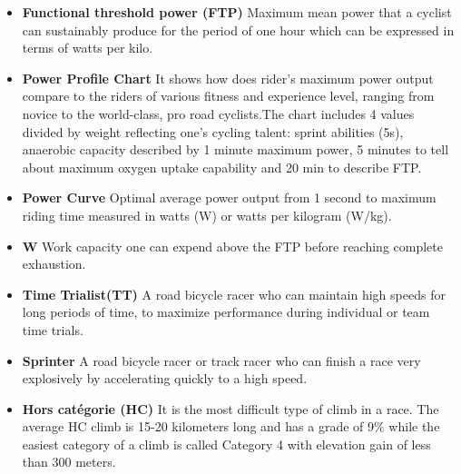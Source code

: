 \begin{itemize}
	\item {\bf Functional threshold power (FTP) } Maximum mean power that a cyclist can sustainably produce for the period of one hour which can be expressed in terms of watts per kilo.
	\item {\bf Power Profile Chart} It shows how does rider's maximum power output compare to the riders of various fitness and experience level, ranging from novice to the world-class, pro road cyclists.The chart includes 4 values divided by weight reflecting one's cycling talent: sprint abilities (5s), anaerobic capacity described by 1 minute maximum power, 5 minutes to tell about maximum oxygen uptake capability and 20 min to describe FTP. 
	\item{\bf Power Curve} Optimal average power output from 1 second to maximum riding time measured in watts (W) or watts per kilogram (W/kg).

	\item {\bf W} Work capacity one can expend above the FTP before reaching complete exhaustion. 
	\item{\bf Time Trialist(TT)} A road bicycle racer who can maintain high speeds for long periods of time, to maximize performance during individual or team time trials. 
	\item{\bf Sprinter} A road bicycle racer or track racer who can finish a race very explosively by accelerating quickly to a high speed.
	\item{\bf Hors catégorie (HC)} It is  the most difficult type of climb in a race. The average HC climb is 15-20 kilometers long and has a grade of 9\% while the easiest category of a climb is called Category 4 with elevation gain of less than 300 meters.
\end{itemize}